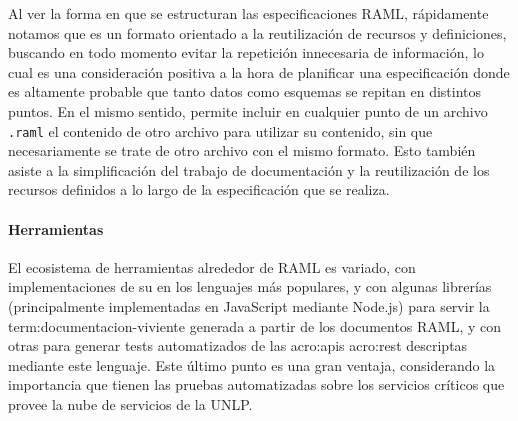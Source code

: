 Al ver la forma en que se estructuran las especificaciones RAML, rápidamente notamos que es un formato orientado a la reutilización de recursos y definiciones, buscando en todo momento evitar la repetición innecesaria de información, lo cual es una consideración positiva a la hora de planificar una especificación donde es altamente probable que tanto datos como esquemas se repitan en distintos puntos. En el mismo sentido, permite incluir en cualquier punto de un archivo \texttt{.raml} el contenido de otro archivo para utilizar su contenido, sin que necesariamente se trate de otro archivo con el mismo formato. Esto también asiste a la simplificación del trabajo de documentación y la reutilización de los recursos definidos a lo largo de la especificación que se realiza.

\paragraph{Herramientas}

El ecosistema de herramientas alrededor de RAML es variado, con implementaciones de su  en los lenguajes más populares, y con algunas librerías (principalmente implementadas en JavaScript mediante Node.js) para servir la \gls{term:documentacion-viviente} generada a partir de los documentos RAML, y con otras para generar tests automatizados de las \glspl{acro:api} \gls{acro:rest} descriptas mediante este lenguaje. Este último punto es una gran ventaja, considerando la importancia que tienen las pruebas automatizadas sobre los servicios críticos que provee la nube de servicios de la UNLP.
